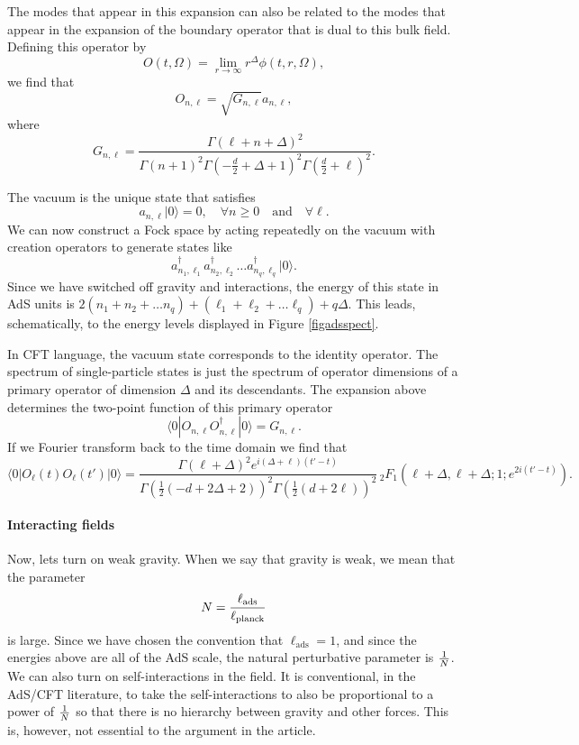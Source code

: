 \documentclass[12pt]{article}
\newcommand{\be}{\begin{equation}}
\newcommand{\ee}{\end{equation}}
\begin{document}
The modes that appear in this expansion can also be related to the modes that appear in the expansion of the boundary operator that is dual to this bulk field. Defining this operator by
\be
O(t, \Omega) = \lim_{r \rightarrow \infty} r^{\Delta} \phi(t, r, \Omega),
\ee
we find that
\be
O_{n, \ell} = \sqrt{G_{n, \ell}} a_{n, \ell},
\ee
where
\be
G_{n, \ell} = \frac{\Gamma (\ell+n+\Delta )^2}{\Gamma (n+1)^2 \Gamma \left(-\frac{d}{2}+\Delta +1\right)^2 \Gamma \left(\frac{d}{2}+\ell\right)^2}.
\ee


The vacuum is the unique state that satisfies
\be
a_{n, \ell} | 0 \rangle = 0, \quad \forall n \geq 0 \quad \text{and} \quad \forall \ell.
\ee
We can now construct a Fock space  by acting repeatedly on the vacuum
with creation operators to generate states like
\[
a_{n_1, \ell_1}^{\dagger} a_{n_2, \ell_2}^{\dagger} \ldots a_{n_q, \ell_q}^{\dagger} | 0 \rangle.
\]
Since we have switched off gravity and interactions, the energy of this state in AdS units is   $2 (n_1 + n_2 + \ldots n_q) + (\ell_1 + \ell_2 + \ldots \ell_q) + q \Delta$. This leads, schematically, to the energy levels displayed in Figure \ref{figadsspect}.

In CFT language, the vacuum state corresponds to the identity operator. The spectrum of single-particle states is just the spectrum of operator dimensions of a primary operator of dimension $\Delta$ and its descendants. The expansion above determines the two-point function of this primary operator
\be
\langle 0| O_{n, \ell} O_{n, \ell}^{\dagger} | 0 \rangle = G_{n, \ell}.
\ee
If we Fourier transform back to the time domain we find that
\be
\langle 0| O_{\ell}(t) O_{\ell}(t') | 0 \rangle = \frac{\Gamma (\ell+\Delta )^2 e^{i(\Delta +\ell)(t' - t)} }{\Gamma \left(\frac{1}{2} (-d+2 \Delta +2)\right)^2 \Gamma \left(\frac{1}{2} (d+2 \ell)\right)^2} \, _2F_1\left(\ell+\Delta ,\ell+\Delta ;1;e^{2 i (t' - t)}\right).
\ee




\paragraph{\bf Interacting fields \\}
Now, lets turn on weak gravity. When we say that gravity is weak, we mean that the parameter
\be
N = {\ell_{\text{ads}} \over \ell_{\text{planck}}} 
\ee
is large. Since we have chosen the convention that $\ell_{\text{ads}} = 1$, and since the energies above are all of the AdS scale, the natural perturbative parameter is ${1 \over N}$.  We can also turn on self-interactions in the field. It is conventional, in the AdS/CFT literature, to take the self-interactions to also be proportional to a power of ${1 \over N}$ so that there is no hierarchy between gravity and other forces. This is, however, not essential to the argument in the article.
\end{document}
